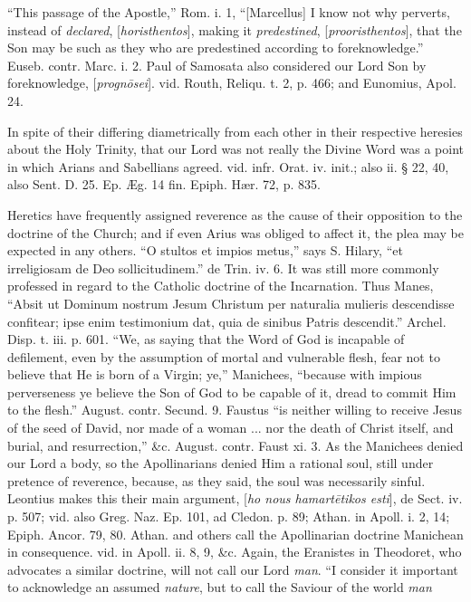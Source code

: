 ``This passage of the Apostle,'' Rom. i. 1, ``[Marcellus]
I know not why perverts, instead of \emph{declared},
[\emph{horisthentos}], making
it \emph{predestined}, [\emph{prooristhentos}],
that the Son may be such as they who are predestined according
to foreknowledge.'' Euseb. contr. Marc. i. 2. Paul of Samosata
also considered our Lord Son by foreknowledge, [\emph{progn\={o}sei}].
vid. Routh, Reliqu. t. 2, p. 466; and Eunomius, Apol. 24.

In spite of their differing diametrically from
each other in their respective heresies about the Holy Trinity, that
our Lord was not really the Divine Word was a point in which Arians
and Sabellians agreed. vid. infr. Orat. iv. init.; also ii.
§ 22, 40, also Sent. D. 25. Ep. Æg. 14 fin. Epiph. Hær. 72,
p. 835.

Heretics have frequently assigned reverence as
the cause of their opposition to the doctrine of the Church; and if
even Arius was obliged to affect it, the plea may be expected in any
others. ``O stultos et impios metus,'' says S. Hilary, ``et irreligiosam
de Deo sollicitudinem.'' de Trin. iv. 6. It was still more commonly
professed in regard to the Catholic doctrine of the Incarnation. Thus
Manes, ``Absit ut Dominum nostrum Jesum Christum per naturalia mulieris
descendisse confitear; ipse enim testimonium dat, quia de sinibus
Patris descendit.'' Archel. Disp. t. iii. p. 601. ``We, as saying that
the Word of God is incapable of defilement, even by the assumption of
mortal and vulnerable flesh, fear not to believe that He is born of a
Virgin; ye,'' Manichees, ``because with impious perverseness ye believe
the Son of God to be capable of it, dread to commit Him to the flesh.''
August. contr. Secund. 9. Faustus ``is neither willing to receive Jesus
of the seed of David, nor made of a woman ... nor the death of Christ
itself, and burial, and resurrection,'' \&c. August. contr. Faust xi.
3. As the Manichees denied our Lord a body, so the Apollinarians
denied Him a rational soul, still under pretence of reverence,
because, as they said, the soul was necessarily sinful. Leontius makes
this their main argument, [\emph{ho nous hamart\={e}tikos esti}],
de Sect. iv. p. 507; vid. also Greg. Naz. Ep. 101, ad Cledon. p. 89;
Athan. in Apoll. i. 2, 14; Epiph. Ancor. 79, 80. Athan. and others
call the Apollinarian doctrine Manichean in consequence. vid. in Apoll.
ii. 8, 9, \&c. Again, the Eranistes in Theodoret, who advocates a
similar doctrine, will not call our Lord \emph{man}.
``I consider it important to acknowledge an assumed \emph{nature},
but to call the Saviour of the world \emph{man}
